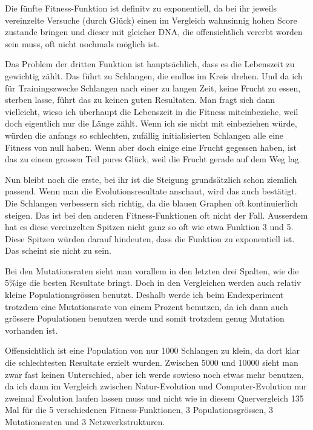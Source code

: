 \documentclass[11pt,a4paper,ngerman]{article}
\begin{document}
\bigskip
Die fünfte Fitness-Funktion ist definitv zu exponentiell, da bei ihr jeweils vereinzelte Versuche (durch Glück) einen im Vergleich wahnsinnig hohen Score zustande bringen und dieser mit gleicher DNA, die offensichtlich vererbt worden sein muss, oft nicht nochmals möglich ist.

\bigskip
Das Problem der dritten Funktion ist hauptsächlich, dass es die Lebenszeit zu gewichtig zählt. Das führt zu Schlangen, die endlos im Kreis drehen. Und da ich für Trainingszwecke Schlangen nach einer zu langen Zeit, keine Frucht zu essen, sterben lasse, führt das zu keinen guten Resultaten. Man fragt sich dann vielleicht, wieso ich überhaupt die Lebenszeit in die Fitness miteinbeziehe, weil doch eigentlich nur die Länge zählt. Wenn ich sie nicht mit einbeziehen würde, würden die anfangs so schlechten, zufällig initialisierten Schlangen alle eine Fitness von null haben. Wenn aber doch einige eine Frucht gegessen haben, ist das zu einem grossen Teil pures Glück, weil die Frucht gerade auf dem Weg lag.

\bigskip
Nun bleibt noch die erste, bei ihr ist die Steigung grundsätzlich schon ziemlich passend. Wenn man die Evolutionsresultate anschaut, wird das auch bestätigt. Die Schlangen verbessern sich richtig, da die blauen Graphen oft kontinuierlich steigen. Das ist bei den anderen Fitness-Funktionen oft nicht der Fall. Ausserdem hat es diese vereinzelten Spitzen nicht ganz so oft wie etwa Funktion 3 und 5. Diese Spitzen würden darauf hindeuten, dass die Funktion zu exponentiell ist. Das scheint sie nicht zu sein.

\bigskip
Bei den Mutationsraten sieht man vorallem in den letzten drei Spalten, wie die 5\%ige die besten Resultate bringt. Doch in den Vergleichen werden auch relativ kleine Populationsgrössen benutzt. Deshalb werde ich beim Endexperiment trotzdem eine Mutationsrate von einem Prozent benutzen, da ich dann auch grössere Populationen benutzen werde und somit trotzdem genug Mutation vorhanden ist.

\bigskip
Offensichtlich ist eine Population von nur 1000 Schlangen zu klein, da dort klar die schlechtesten Resultate erzielt wurden. Zwischen 5000 und 10000 sieht man zwar fast keinen Unterschied, aber ich werde sowieso noch etwas mehr benutzen, da ich dann im Vergleich zwischen Natur-Evolution und Computer-Evolution nur zweimal Evolution laufen lassen muss und nicht wie in diesem Quervergleich 135 Mal für die 5 verschiedenen Fitness-Funktionen, 3 Populationsgrössen, 3 Mutationsraten und 3 Netzwerkstrukturen.
\end{document}
